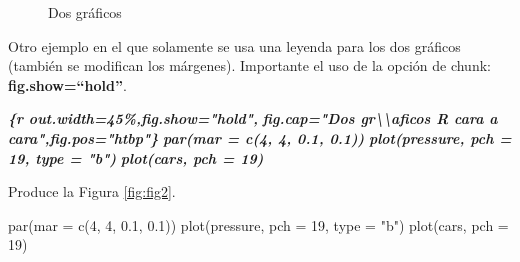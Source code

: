 \documentclass[12pt,a4paper,oneside,]{article}
\newenvironment{Shaded}{\begin{snugshade}}{\end{snugshade}}
\newcommand{\AttributeTok}[1]{\textcolor[rgb]{0.77,0.63,0.00}{#1}}
\newcommand{\DecValTok}[1]{\textcolor[rgb]{0.00,0.00,0.81}{#1}}
\newcommand{\FloatTok}[1]{\textcolor[rgb]{0.00,0.00,0.81}{#1}}
\newcommand{\FunctionTok}[1]{\textcolor[rgb]{0.00,0.00,0.00}{#1}}
\newcommand{\InformationTok}[1]{\textcolor[rgb]{0.56,0.35,0.01}{\textbf{\textit{#1}}}}
\newcommand{\NormalTok}[1]{#1}
\newcommand{\StringTok}[1]{\textcolor[rgb]{0.31,0.60,0.02}{#1}}
\numberwithin{dummy}{section}
\theoremstyle{ocrenumbox}
\theoremstyle{blacknumex}
\theoremstyle{blacknumbox}
\theoremstyle{ocrenum}
\theoremstyle{ocrenum}
\begin{document}
\begin{figure}[htbp]

{\centering {}

}

\caption{Dos gr\'aficos}\label{fig:plot-cars}
\end{figure}

Otro ejemplo en el que solamente se usa una leyenda para los dos
gráficos (también se modifican los márgenes). Importante el uso de la
opción de chunk: \textbf{fig.show=``hold''}.

\begin{Shaded}
\begin{Highlighting}[]
\InformationTok{\textasciigrave{}\textasciigrave{}\textasciigrave{}\{r out.width=\textquotesingle{}45\%\textquotesingle{},fig.show="hold",}
\InformationTok{        fig.cap="Dos gr\textbackslash{}\textbackslash{}\textquotesingle{}aficos R cara a cara",fig.pos="htbp"\}}
\InformationTok{par(mar = c(4, 4, 0.1, 0.1))}
\InformationTok{plot(pressure, pch = 19, type = "b")}
\InformationTok{plot(cars, pch = 19)}
\InformationTok{\textasciigrave{}\textasciigrave{}\textasciigrave{}}
\end{Highlighting}
\end{Shaded}

Produce la Figura \ref{fig:fig2}.

\begin{Shaded}
\begin{Highlighting}[]
\FunctionTok{par}\NormalTok{(}\AttributeTok{mar =} \FunctionTok{c}\NormalTok{(}\DecValTok{4}\NormalTok{, }\DecValTok{4}\NormalTok{, }\FloatTok{0.1}\NormalTok{, }\FloatTok{0.1}\NormalTok{))}
\FunctionTok{plot}\NormalTok{(pressure, }\AttributeTok{pch =} \DecValTok{19}\NormalTok{, }\AttributeTok{type =} \StringTok{"b"}\NormalTok{)}
\FunctionTok{plot}\NormalTok{(cars, }\AttributeTok{pch =} \DecValTok{19}\NormalTok{)}
\end{Highlighting}
\end{Shaded}
\end{document}
